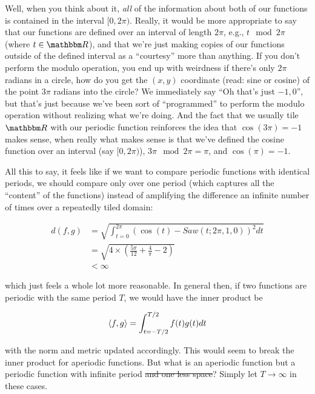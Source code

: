\documentclass[letterpaper,12pt]{report}
\begin{document}
Well, when you think about it, \emph{all} of the information
about both of our functions 
is contained in the interval \([0, 2\pi)\).
Really, it would be more appropriate to say that our
functions are defined over an interval of length \(2\pi\),
e.g.,
\(t \mod 2\pi \) (where \(t \in \domain{R}\)), and that
we're just making copies of our functions outside of
the defined interval as a ``courtesy'' more than
anything. If you don't perform the modulo operation,
you end up with weirdness \textemdash{} if there's only
\(2\pi\) radians in a circle, how do you get the
\((x,y)\) coordinate (read: sine or cosine) of the
point \(3\pi\) radians into the circle? We immediately
say ``Oh that's just \(-1,0\)'', but that's just because
we've been sort of ``programmed'' to perform the modulo
operation without realizing what we're doing.
And the
fact that we usually tile \(\domain{R}\) 
with our periodic function
reinforces the idea that \(\cos(3\pi) = -1\) makes sense, when
really what makes sense is that we've defined the cosine function
over an interval (say \([0, 2\pi)\)), \(3\pi \mod 2\pi = \pi\),
and \(\cos(\pi) = -1\).\par

All this to say, it feels like if we want to compare periodic
functions with identical periods, we should compare
only over one period (which captures all the ``content''
of the functions) instead of amplifying the difference an
infinite number of times over a repeatedly tiled domain:

\[
\begin{split} d(f,g) &= \sqrt{\int_{t = 0}^{2\pi} \left(\cos(t) - Saw(t; 2\pi, 1, 0)\right)^2 dt} \\
  &= \sqrt{4 \times \left(\frac{5\pi}{12} + \frac{4}{\pi} - 2\right)} \\
  &< \infty
\end{split}
\]

which just feels a whole lot more reasonable.
In general then, if two functions are periodic with the same period \(T\),
we would have the inner product be

\[\left<f,g\right> = \int_{t=-T/2}^{T/2} f(t)g(t) dt \]

with the norm and metric updated accordingly.
This would seem to break the inner product for aperiodic functions.
But what is an aperiodic function but a periodic function with
infinite period \sout{and one less space}?
Simply let \(T \rightarrow \infty\) in these cases.
\end{document}
